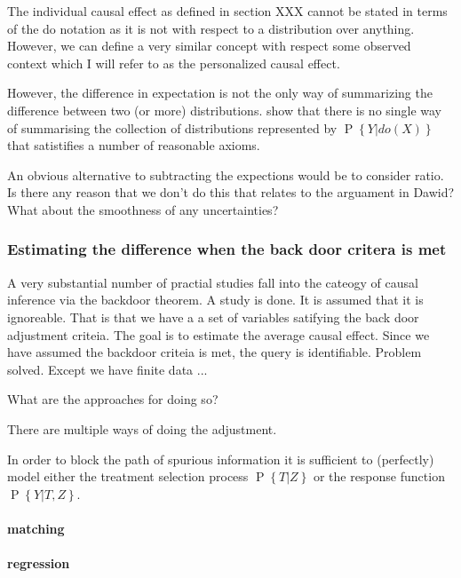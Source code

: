 \documentclass[11pt,a4paper,oneside]{book}
\renewcommand{\P}[1]{\operatorname{P}\left\{#1\right\}}
\begin{document}

The individual causal effect as defined in section XXX cannot be stated in terms of the do notation as it is not with respect to a distribution over anything. However, we can define a very similar concept with respect some observed context which I will refer to as the personalized causal effect. 


However, the difference in expectation is not the only way of summarizing the difference between two (or more) distributions. \citep{Janzing2013} show that there is no single way of summarising the collection of distributions represented by $\P{Y|do(X)}$ that satistifies a number of reasonable axioms. 

An obvious alternative to subtracting the expections would be to consider ratio. Is there any reason that we don't do this that relates to the arguament in Dawid? What about the smoothness of any uncertainties?

\subsubsection*{Estimating the difference when the back door critera is met}

A very substantial number of practial studies fall into the cateogy of causal inference via the backdoor theorem. A study is done. It is assumed that it is ignoreable. That is that we have a a set of variables satifying the back door adjustment criteia. The goal is to estimate the average causal effect. Since we have assumed the backdoor criteia is met, the query is identifiable. Problem solved. Except we have finite data ...

What are the approaches for doing so? 

There are multiple ways of doing the adjustment. 

In order to block the path of spurious information it is sufficient to (perfectly) model either the treatment selection process $\P{T|Z}$ or the response function $\P{Y|T,Z}$. 

\paragraph*{matching}

\paragraph*{regression}
\end{document}
